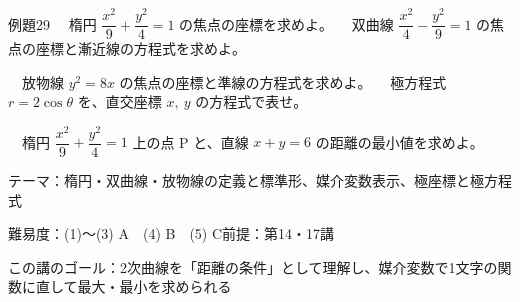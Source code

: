 \documentclass[paper=b5j, fontsize=8pt, fleqn, twoside]{jlreq}
\begin{document}
\begin{ascolorbox4A}[出典：オリジナル]{例題29}
  　楕円 $\dfrac{x^2}9+\dfrac{y^2}4=1$ の焦点の座標を求めよ。\qquad
  　双曲線 $\dfrac{x^2}4-\dfrac{y^2}9=1$ の焦点の座標と漸近線の方程式を求めよ。\par
  　放物線 $y^2=8x$ の焦点の座標と準線の方程式を求めよ。\qquad
  　極方程式 $r=2\cos\theta$ を、直交座標 $x,\ y$ の方程式で表せ。\par
  　楕円 $\dfrac{x^2}9+\dfrac{y^2}4=1$ 上の点 P と、直線 $x+y=6$ の距離の最小値を求めよ。
\end{ascolorbox4A}

\begin{Data}
  テーマ：楕円・双曲線・放物線の定義と標準形、媒介変数表示、極座標と極方程式\par
  難易度：(1)〜(3) A　(4) B　(5) C\quad 前提：第14・17講\par
  この講のゴール：2次曲線を「距離の条件」として理解し、媒介変数で1文字の関数に直して最大・最小を求められる
\end{Data}
\end{document}

